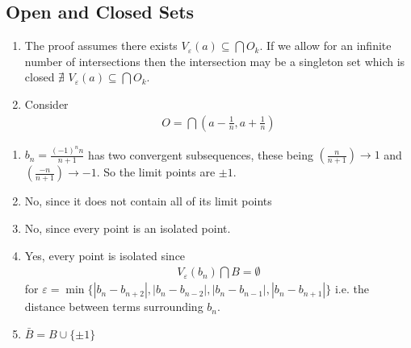 \subsection{Open and Closed Sets}

\begin{enumerate}[label=(\alph*)]
    \item 
    The proof assumes there exists $V_\varepsilon(a) \subseteq \bigcap O_k$.
    If we allow for an infinite number of intersections then the intersection 
    may be a singleton set which is closed $\nexists$ $V_\varepsilon(a) \subseteq \bigcap O_k$.
    
    \item
    Consider 
    \begin{align*}
        O = \bigcap (a-\frac{1}{n}, a+\frac{1}{n}) 
    \end{align*}
\end{enumerate}

\begin{enumerate}[label=(\alph*)]
    \item 
    $b_n = \frac{(-1)^n n }{n+1}$ has two convergent subsequences, 
    these being 
    $(\frac{n }{n+1}) \rightarrow 1$ and $(\frac{-n}{n+1}) \rightarrow -1$.
    So the limit points are $\pm 1$.

    \item
    No, since it does not contain all of its limit points

    \item 
    No, since every point is an isolated point.

    \item
    Yes, every point is isolated since
    \begin{align*}
        V_\varepsilon(b_n) \bigcap B = \emptyset
    \end{align*}
    for $\varepsilon = \min\{ |b_n - b_{n+2}|, |b_n - b_{n-2}|, |b_n - b_{n-1}|, |b_n - b_{n+1}| \}$ i.e.
    the distance between terms surrounding $b_n$.

    \item
    $\bar B = B \cup \{\pm 1\}$
\end{enumerate}

